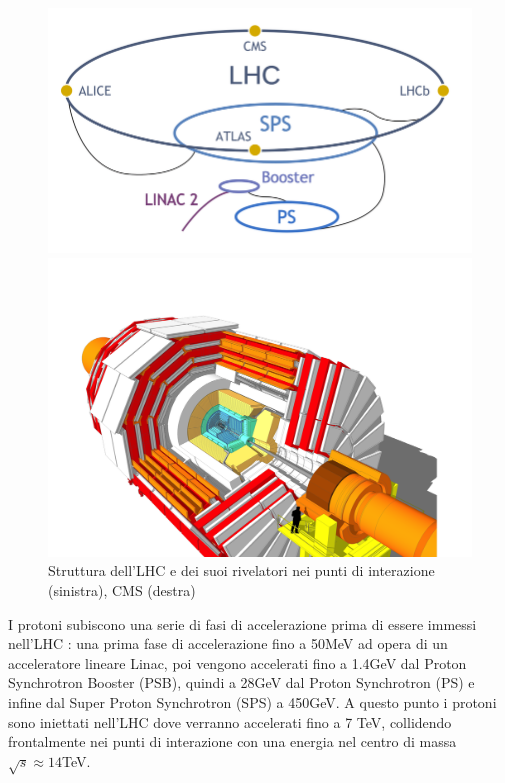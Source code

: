 \begin{figure}[t]
  \centering
  \begin{minipage}[b]{0.45\textwidth}
      \centering
      \includegraphics[width=\textwidth]{../ImmaginiTesi/LHC.png} 
  \end{minipage}
  \hfill 
  \begin{minipage}[b]{0.5\textwidth}
      \centering
      \includegraphics[width=\textwidth]{../ImmaginiTesi/CMS.png} 
  \end{minipage}
  \caption{Struttura dell'LHC e dei suoi rivelatori nei punti di interazione (sinistra), CMS (destra)}
  \label{fig:LHC-CMS}
\end{figure}

I protoni subiscono una serie di fasi di accelerazione prima di essere immessi nell'LHC \cite{evans2008lhc}: una prima fase di accelerazione fino a 50MeV ad opera di un acceleratore lineare Linac, poi vengono accelerati fino a 1.4GeV dal Proton Synchrotron Booster (PSB), quindi a 28GeV dal Proton Synchrotron (PS) e infine dal Super Proton Synchrotron (SPS) a 450GeV. A questo punto i protoni sono iniettati nell'LHC dove verranno accelerati fino a 7 TeV, collidendo frontalmente nei punti di interazione con una energia nel centro di massa $\sqrt{s} \approx 14$TeV.

